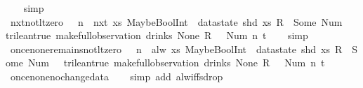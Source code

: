 \begin{isabellebody}
%
\isadelimproof
\ \ %
\endisadelimproof
%
\isatagproof
{}\isamarkupfalse%
\ simp%
\endisatagproof
{\isafoldproof}%
%
\isadelimproof
\isanewline
%
\endisadelimproof
\isanewline
{}\isamarkupfalse%
\ nxt{\isacharunderscore}not{\isacharunderscore}lt{\isacharunderscore}zero{\isacharcolon}\ {\isachardoublequoteopen}{}\ {\isasymle}\ n\ {\isasymLongrightarrow}\ nxt\ {\isacharparenleft}{\isasymlambda}xs{\isachardot}\ MaybeBoolInt\ {\isacharparenleft}{\isacharless}{\isacharparenright}\ {\isacharparenleft}datastate\ {\isacharparenleft}shd\ xs{\isacharparenright}\ {\isacharparenleft}R\ {}{\isacharparenright}{\isacharparenright}\ {\isacharparenleft}Some\ {\isacharparenleft}Num\ {}{\isacharparenright}{\isacharparenright}\ {\isasymnoteq}\ trilean{\isachardot}true{\isacharparenright}\ {\isacharparenleft}make{\isacharunderscore}full{\isacharunderscore}observation\ drinks\ None\ {\isacharless}R\ {}\ {\isacharcolon}{\isacharequal}\ Num\ n{\isachargreater}\ t{\isacharparenright}{\isachardoublequoteclose}\isanewline
%
\isadelimproof
\ \ %
\endisadelimproof
%
\isatagproof
{}\isamarkupfalse%
\ simp%
\endisatagproof
{\isafoldproof}%
%
\isadelimproof
\isanewline
%
\endisadelimproof
\isanewline
{}\isamarkupfalse%
\ once{\isacharunderscore}none{\isacharunderscore}remains{\isacharunderscore}not{\isacharunderscore}lt{\isacharunderscore}zero{\isacharcolon}\ {\isachardoublequoteopen}{}\ {\isasymle}\ n\ {\isasymLongrightarrow}\ alw\ {\isacharparenleft}{\isasymlambda}xs{\isachardot}\ MaybeBoolInt\ {\isacharparenleft}{\isacharless}{\isacharparenright}\ {\isacharparenleft}datastate\ {\isacharparenleft}shd\ xs{\isacharparenright}\ {\isacharparenleft}R\ {}{\isacharparenright}{\isacharparenright}\ {\isacharparenleft}Some\ {\isacharparenleft}Num\ {}{\isacharparenright}{\isacharparenright}\ {\isasymnoteq}\ trilean{\isachardot}true{\isacharparenright}\ {\isacharparenleft}make{\isacharunderscore}full{\isacharunderscore}observation\ drinks\ None\ {\isacharless}R\ {}\ {\isacharcolon}{\isacharequal}\ Num\ n{\isachargreater}\ t{\isacharparenright}{\isachardoublequoteclose}\isanewline
%
\isadelimproof
\ \ %
\endisadelimproof
%
\isatagproof
{}\isamarkupfalse%
\ once{\isacharunderscore}none{\isacharunderscore}no{\isacharunderscore}change{\isacharunderscore}data\isanewline
\ \ \isamarkupfalse%
\ {\isacharparenleft}simp\ add{\isacharcolon}\ alw{\isacharunderscore}iff{\isacharunderscore}sdrop{\isacharparenright}%
\endisatagproof

\end{isabellebody}
